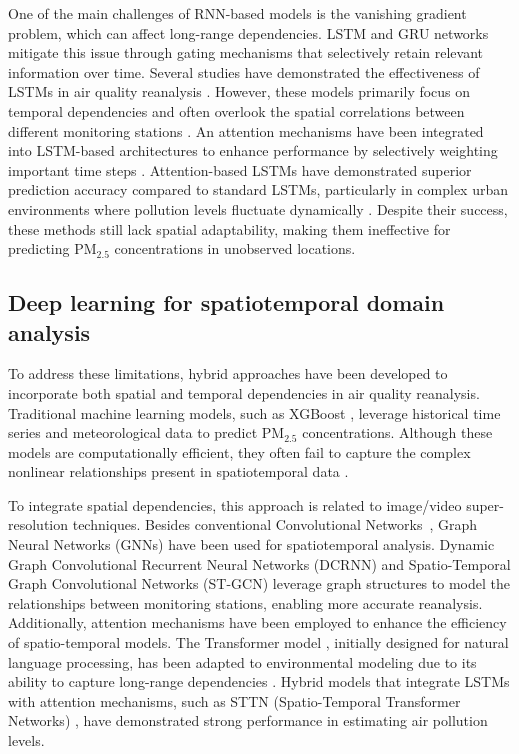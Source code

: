 One of the main challenges of RNN-based models is the vanishing gradient problem, which can affect long-range dependencies. LSTM and GRU networks mitigate this issue through gating mechanisms that selectively retain relevant information over time. Several studies have demonstrated the effectiveness of LSTMs in air quality reanalysis \cite{feng2020deep}. However, these models primarily focus on temporal dependencies and often overlook the spatial correlations between different monitoring stations \cite{zhang2021review}. An attention mechanisms \cite{vaswani2017attention} have been integrated into LSTM-based architectures to enhance performance by selectively weighting important time steps \cite{zhao2022attention}. Attention-based LSTMs have demonstrated superior prediction accuracy compared to standard LSTMs, particularly in complex urban environments where pollution levels fluctuate dynamically \cite{yang2020hybrid}. Despite their success, these methods still lack spatial adaptability, making them ineffective for predicting PM\(_{2.5}\) concentrations in unobserved locations. 

\subsection{Deep learning for spatiotemporal domain analysis}
To address these limitations, hybrid approaches have been developed to incorporate both spatial and temporal dependencies in air quality reanalysis. Traditional machine learning models, such as XGBoost \cite{chen2016xgboost}, leverage historical time series and meteorological data to predict PM\(_{2.5}\) concentrations. Although these models are computationally efficient, they often fail to capture the complex nonlinear relationships present in spatiotemporal data \cite{yan2018spatial}.

To integrate spatial dependencies, 
this approach is related to image/video super-resolution techniques. Besides conventional Convolutional Networks~\cite{sr_1,sr_2,sr_3,sr_4}, Graph Neural Networks (GNNs) have been used for spatiotemporal analysis. Dynamic Graph Convolutional Recurrent Neural Networks (DCRNN) \cite{li2018dcrnn} and Spatio-Temporal Graph Convolutional Networks (ST-GCN) \cite{yan2018spatial} leverage graph structures to model the relationships between monitoring stations, enabling more accurate reanalysis. Additionally, attention mechanisms have been employed to enhance the efficiency of spatio-temporal models. The Transformer model \cite{vaswani2017attention}, initially designed for natural language processing, has been adapted to environmental modeling due to its ability to capture long-range dependencies \cite{xu2020spatio}. Hybrid models that integrate LSTMs with attention mechanisms, such as STTN (Spatio-Temporal Transformer Networks) \cite{xu2020spatio}, have demonstrated strong performance in estimating air pollution levels.